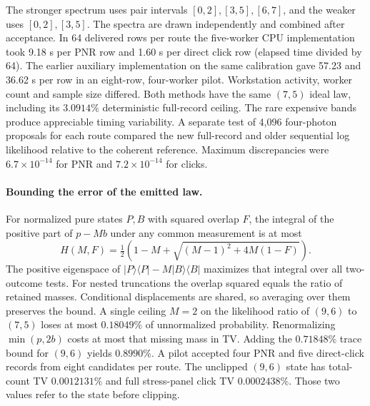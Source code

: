 \documentclass[11pt]{article}
\begin{document}
The stronger spectrum uses pair intervals $[0,2],[3,5],[6,7]$, and the weaker uses $[0,2],[3,5]$. The spectra are drawn independently and combined after acceptance. In 64 delivered rows per route the five-worker CPU implementation took 9.18 s per PNR row and 1.60 s per direct click row (elapsed time divided by 64). The earlier auxiliary implementation on the same calibration gave 57.23 and 36.62 s per row in an eight-row, four-worker pilot. Workstation activity, worker count and sample size differed. Both methods have the same $(7,5)$ ideal law, including its $3.0914\%$ deterministic full-record ceiling. The rare expensive bands produce appreciable timing variability. A separate test of 4,096 four-photon proposals for each route compared the new full-record and older sequential log likelihood relative to the coherent reference. Maximum discrepancies were $6.7\times10^{-14}$ for PNR and $7.2\times10^{-14}$ for clicks.

\paragraph{Bounding the error of the emitted law.}
For normalized pure states $P,B$ with squared overlap $F$, the integral of the positive part of $p-Mb$ under any common measurement is at most
\[
 H(M,F)=\tfrac12\left(1-M+\sqrt{(M-1)^2+4M(1-F)}\right).
\]
The positive eigenspace of $|P\rangle\langle P|-M|B\rangle\langle B|$ maximizes that integral over all two-outcome tests. For nested truncations the overlap squared equals the ratio of retained masses. Conditional displacements are shared, so averaging over them preserves the bound. A single ceiling $M=2$ on the likelihood ratio of $(9,6)$ to $(7,5)$ loses at most $0.18049\%$ of unnormalized probability. Renormalizing $\min(p,2b)$ costs at most that missing mass in TV. Adding the $0.71848\%$ trace bound for $(9,6)$ yields $0.8990\%$. A pilot accepted four PNR and five direct-click records from eight candidates per route. The unclipped $(9,6)$ state has total-count TV $0.0012131\%$ and full stress-panel click TV $0.0002438\%$. Those two values refer to the state before clipping.
\end{document}
